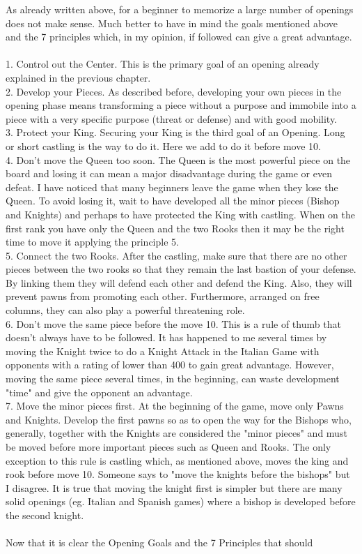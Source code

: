 \documentclass{article}
\begin{document}
As already written above, for a beginner to memorize a large number of openings does not make sense. Much better to have in mind the goals mentioned above and the 7 principles which, in my opinion, if followed can give a great advantage.\\\\1. Control out the Center. This is the primary goal of an opening already explained in the previous chapter.\\2. Develop your Pieces. As described before, developing your own pieces in the opening phase means transforming a piece without a purpose and immobile into a piece with a very specific purpose (threat or defense) and with good mobility.\\3. Protect your King. Securing your King is the third goal of an Opening. Long or short castling is the way to do it. Here we add to do it before move 10.\\4. Don't move the Queen too soon. The Queen is the most powerful piece on the board and losing it can mean a major disadvantage during the game or even defeat. I have noticed that many beginners leave the game when they lose the Queen. To avoid losing it, wait to have developed all the minor pieces (Bishop and Knights) and perhaps to have protected the King with castling. When on the first rank you have only the Queen and the two Rooks then it may be the right time to move it applying the principle 5.\\5. Connect the two Rooks. After the castling, make sure that there are no other pieces between the two rooks so that they remain the last bastion of your defense. By linking them they will defend each other and defend the King. Also, they will prevent pawns from promoting each other. Furthermore, arranged on free columns, they can also play a powerful threatening role.\\6. Don't move the same piece before the move 10. This is a rule of thumb that doesn't always have to be followed. It has happened to me several times by moving the Knight twice to do a Knight Attack in the Italian Game with opponents with a rating of lower than 400 to gain great advantage. However, moving the same piece several times, in the beginning, can waste development "time" and give the opponent an advantage.\\7. Move the minor pieces first. At the beginning of the game, move only Pawns and Knights. Develop the first pawns so as to open the way for the Bishops who, generally, together with the Knights are considered the "minor pieces" and must be moved before more important pieces such as Queen and Rooks. The only exception to this rule is castling which, as mentioned above, moves the king and rook before move 10. Someone says to "move the knights before the bishops" but I disagree. It is true that moving the knight first is simpler but there are many solid openings (eg. Italian and Spanish games) where a bishop is developed before the second knight.\\\\Now that it is clear the Opening Goals and the 7 Principles that should 
\end{document}
